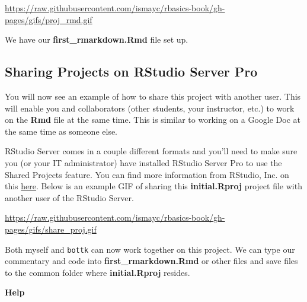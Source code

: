 \documentclass[]{tufte-book}
\begin{document}
\vspace{0.1in}

\begin{center}\footnotesize{\url{https://raw.githubusercontent.com/ismayc/rbasics-book/gh-pages/gifs/proj_rmd.gif}}\end{center}

\vspace{0.1in}

We have our \textbf{first\_rmarkdown.Rmd} file set up.

\subsection{Sharing Projects on RStudio Server
Pro}\label{sharing-projects-on-rstudio-server-pro}

You will now see an example of how to share this project with another
user. This will enable you and collaborators (other students, your
instructor, etc.) to work on the \textbf{Rmd} file at the same time.
This is similar to working on a Google Doc at the same time as someone
else.

RStudio Server comes in a couple different formats and you'll need to
make sure you (or your IT administrator) have installed RStudio Server
Pro to use the Shared Projects feature. You can find more information
from RStudio, Inc. on this
\href{https://support.rstudio.com/hc/en-us/articles/211659737-Sharing-Projects-in-RStudio-Server-Pro}{here}.
Below is an example GIF of sharing this \textbf{initial.Rproj} project
file with another user of the RStudio Server.

\vspace{0.1in}

\begin{center}\footnotesize{\url{https://raw.githubusercontent.com/ismayc/rbasics-book/gh-pages/gifs/share_proj.gif}}\end{center}

\vspace{0.1in}

Both myself and \texttt{bottk} can now work together on this project. We
can type our commentary and code into \textbf{first\_rmarkdown.Rmd} or
other files and save files to the common folder where
\textbf{initial.Rproj} resides.

\vspace*{0.2in}

\noindent\textbf{Help}\vspace*{0.1in}


\end{document}
